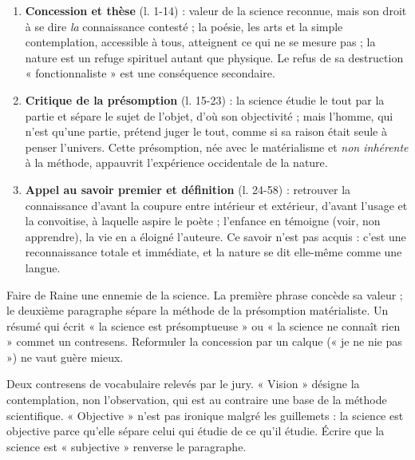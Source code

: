 \documentclass[11pt,a4paper]{article}
\providecommand{\tightlist}{\setlength{\itemsep}{0pt}\setlength{\parskip}{0pt}}
\begin{document}
\begin{enumerate}
\def\labelenumi{\arabic{enumi}.}
\tightlist
\item
  \textbf{Concession et thèse} (l. 1-14) : valeur de la science reconnue, mais son droit à se dire \emph{la} connaissance contesté ; la poésie, les arts et la simple contemplation, accessible à tous, atteignent ce qui ne se mesure pas ; la nature est un refuge spirituel autant que physique. Le refus de sa destruction « fonctionnaliste » est une conséquence secondaire.
\item
  \textbf{Critique de la présomption} (l. 15-23) : la science étudie le tout par la partie et sépare le sujet de l'objet, d'où son objectivité ; mais l'homme, qui n'est qu'une partie, prétend juger le tout, comme si sa raison était seule à penser l'univers. Cette présomption, née avec le matérialisme et \emph{non inhérente} à la méthode, appauvrit l'expérience occidentale de la nature.
\item
  \textbf{Appel au savoir premier et définition} (l. 24-58) : retrouver la connaissance d'avant la coupure entre intérieur et extérieur, d'avant l'usage et la convoitise, à laquelle aspire le poète ; l'enfance en témoigne (voir, non apprendre), la vie en a éloigné l'auteure. Ce savoir n'est pas acquis : c'est une reconnaissance totale et immédiate, et la nature se dit elle-même comme une langue.
\end{enumerate}

\begin{piege}

Faire de Raine une ennemie de la science. La première phrase concède sa valeur ; le deuxième paragraphe sépare la méthode de la présomption matérialiste. Un résumé qui écrit « la science est présomptueuse » ou « la science ne connaît rien » commet un contresens. Reformuler la concession par un calque (« je ne nie pas ») ne vaut guère mieux.

\end{piege}

\begin{piege}

Deux contresens de vocabulaire relevés par le jury. « Vision » désigne la contemplation, non l'observation, qui est au contraire une base de la méthode scientifique. « Objective » n'est pas ironique malgré les guillemets : la science est objective parce qu'elle sépare celui qui étudie de ce qu'il étudie. Écrire que la science est « subjective » renverse le paragraphe.

\end{piege}
\end{document}
